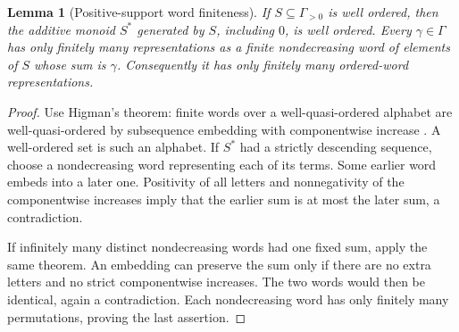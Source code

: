 \documentclass[11pt,a4paper]{article}
\numberwithin{equation}{section}
\newtheorem{lemma}[theorem]{Lemma}
\theoremstyle{definition}
\begin{document}
\begin{lemma}[Positive-support word finiteness]\label{scale:lem:neumann}
If $S\subseteq\Gamma_{>0}$ is well ordered, then the additive monoid
$S^*$ generated by $S$, including $0$, is well ordered. Every
$\gamma\in\Gamma$ has only finitely many representations as a finite
nondecreasing word of elements of $S$ whose sum is $\gamma$.
Consequently it has only finitely many ordered-word representations.
\end{lemma}
\begin{proof}
Use Higman's theorem: finite words over a well-quasi-ordered alphabet
are well-quasi-ordered by subsequence embedding with componentwise
increase \cite{Higman}. A well-ordered set is such an alphabet.
If $S^*$ had a strictly descending sequence, choose a nondecreasing
word representing each of its terms. Some earlier word embeds into
a later one. Positivity of all letters and nonnegativity of the
componentwise increases imply that the earlier sum is at most the
later sum, a contradiction.

If infinitely many distinct nondecreasing words had one fixed sum,
apply the same theorem. An embedding can preserve the sum only if
there are no extra letters and no strict componentwise increases.
The two words would then be identical, again a contradiction.
Each nondecreasing word has only finitely many permutations, proving
the last assertion.
\end{proof}
\end{document}
